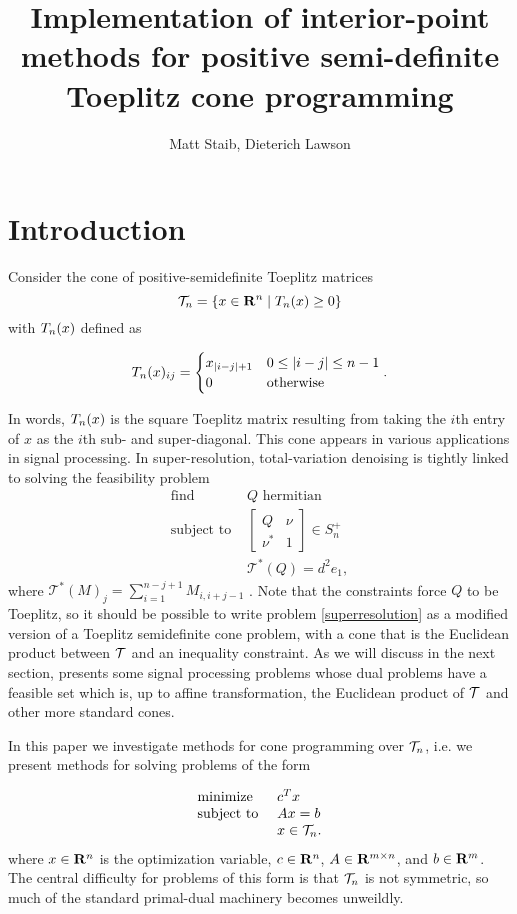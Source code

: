 \documentclass{article}
\title{Implementation of interior-point methods for positive semi-definite Toeplitz cone programming}
\author{Matt Staib, Dieterich Lawson}
\begin{document}
\maketitle
\large
\section{Introduction}
Consider the cone of positive-semidefinite Toeplitz matrices
\[
  \mathcal{T}_n = \{x \in \mathbf{R}^n \mid T_n(x) \geq 0\}
\]
with $T_n(x)$ defined as

\[
  T_n(x)_{ij} = \begin{cases}
      x_{|i-j|+1} &  0 \leq |i-j| \leq n-1 \\
      0 & \mbox{otherwise}
\end{cases}.
\]

In words, $T_n (x)$ is the square Toeplitz matrix resulting from taking the $i$th
entry of $x$ as the $i$th sub- and super-diagonal. This cone appears in various applications
in signal processing. In super-resolution, total-variation denoising is tightly
linked to solving the feasibility problem 
\begin{equation}\label{superresolution}
  \begin{array}{ll}
    \mbox{find}    & Q \text{ hermitian}\\
    \mbox{subject to } & \begin{bmatrix} Q & \nu \\ \nu^* & 1 \end{bmatrix} \in S_n^+\\
                       & \mathcal T^*(Q) = d^2 e_1,
  \end{array}
\end{equation}
where $\mathcal T^*(M)_j = \sum_{i=1}^{n-j+1} M_{i, i+j-1}$ \cite{fernandez2014convex}.
Note that the constraints force $Q$ to be Toeplitz, so it should be possible to write 
problem \ref{superresolution} as a modified version of a Toeplitz semidefinite cone problem, with a cone that is the Euclidean product between $\mathcal{T}$ and an inequality constraint. As we will discuss in the next section, \cite{alkire2002convex} presents some signal processing problems whose dual problems have a feasible set which is, up to affine transformation, the Euclidean product of $\mathcal{T}$ and other more standard cones.

In this paper we investigate methods for cone programming
over $\mathcal{T}_n$, i.e. we present methods for solving problems of the form

\begin{equation}\label{primal}
  \begin{array}{ll}
    \mbox{minimize}    & c^Tx \\
    \mbox{subject to } & Ax = b \\
                       & x \in \mathcal{T}_n. 
  \end{array}
\end{equation}
where $x\in \mathbf{R}^n$ is the optimization variable, $c \in \mathbf{R}^n$, $A \in \mathbf{R}^{m\times n}$, 
and $b \in \mathbf{R}^m$. The central difficulty for problems of this form is that $\mathcal{T}_n$
is not symmetric, so much of the standard primal-dual machinery becomes unweildly.
\end{document}
